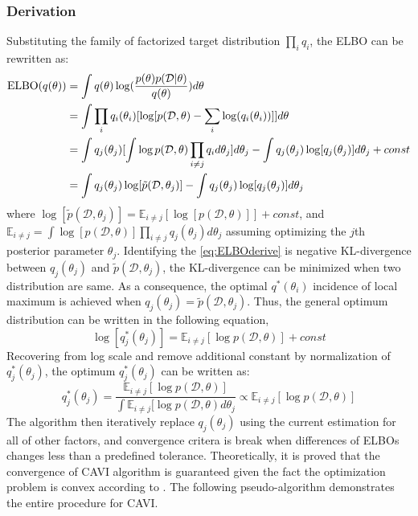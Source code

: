 \subsubsection{Derivation}
Substituting the family of factorized target distribution $\prod_i q_i$, the ELBO can be rewritten as:
\begin{equation}
	\label{eq:ELBOderive}	
	\begin{aligned}
		\textnormal{ELBO}(q(\theta)) &= \int q(\theta)\log(\frac{p(\theta)p(\mathcal{D}|\theta)}{q(\theta)})d\theta \\
		&= \int \prod_i q_i(\theta_i) [\log[p(\mathcal{D},\theta) - \sum_i \log(q_i(\theta_i))]]d\theta \\
		&= \int q_j(\theta_j)[\int \log p(\mathcal{D},\theta) \prod_{i\neq j}q_i d\theta_j]d\theta_j - \int q_j(\theta_j) \log[q_j(\theta_j)]d\theta_j + const\\
		&= \int q_j(\theta_j) \log[\tilde{p}(\mathcal{D},\theta_j)] - \int q_j(\theta_j) \log[q_j(\theta_j)]d\theta_j
	\end{aligned}
\end{equation}
where $\log[\tilde{p}(\mathcal{D},\theta_j)] = \mathbb{E}_{i \neq j}[\log[p(\mathcal{D},\theta)]] + const$, and $\mathbb{E}_{i\neq j} = \int \log[p(\mathcal{D},\theta)]\prod_{i\neq j}q_j(\theta_j)d\theta_j$ assuming optimizing the $j$th posterior parameter $\theta_j$.
Identifying the \ref{eq:ELBOderive} is negative KL-divergence between $q_j(\theta_j) $ and $\tilde{p}(\mathcal{D},\theta_j)$, the KL-divergence can be minimized when two distribution are same.
As a consequence, the optimal $q^{*}(\theta_i)$ incidence of local maximum is achieved when $q_j(\theta_j) = \tilde{p}(\mathcal{D},\theta_j)$. Thus, the general optimum distribution can be written in the following equation,
\begin{equation}
	\label{eq:logoptimumQ}
	\log[q_j^*(\theta_j)] = \mathbb{E}_{i\neq j}[\log p(\mathcal{D},\theta)] + const
\end{equation}
Recovering from log scale and remove additional constant by normalization of $q_j^*(\theta_j)$, the optimum $q_j^*(\theta_j)$ can be written as:
\begin{equation}
	\label{eq:optimalSolution}
	q_j^*(\theta_j) = \frac{\mathbb{E}_{i\neq j}[\log p(\mathcal{D},\theta)]}{\int \mathbb{E}_{i\neq j}[\log p(\mathcal{D},\theta)d\theta_j} \propto \mathbb{E}_{i\neq j}[\log p(\mathcal{D},\theta)]
\end{equation}
The algorithm then iteratively replace $q_j(\theta_j)$ using the current estimation for all of other factors, and convergence critera is break when differences of ELBOs changes less than a predefined tolerance. Theoretically, it is proved that the convergence of CAVI algorithm is guaranteed given the fact the optimization problem is convex according to \cite{boyd2004convex}. The following pseudo-algorithm demonstrates the entire procedure for CAVI.

